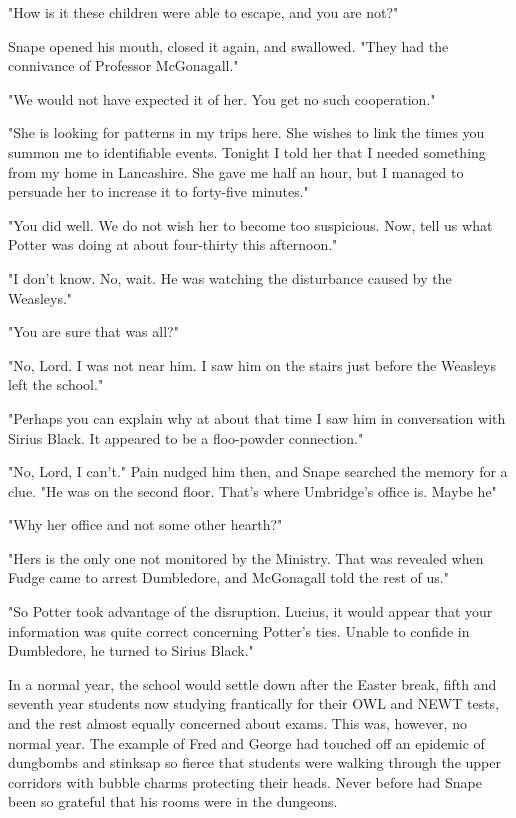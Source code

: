 "How is it these children were able to escape, and you are not?"

Snape opened his mouth, closed it again, and swallowed. "They had the connivance of Professor McGonagall."

"We would not have expected it of her. You get no such cooperation."

"She is looking for patterns in my trips here. She wishes to link the times you summon me to identifiable events. Tonight I told her that I needed something from my home in Lancashire. She gave me half an hour, but I managed to persuade her to increase it to forty-five minutes."

"You did well. We do not wish her to become too suspicious. Now, tell us what Potter was doing at about four-thirty this afternoon."

"I don't know. No, wait. He was watching the disturbance caused by the Weasleys."

"You are sure that was all?"

"No, Lord. I was not near him. I saw him on the stairs just before the Weasleys left the school."

"Perhaps you can explain why at about that time I saw him in conversation with Sirius Black. It appeared to be a floo-powder connection."

"No, Lord, I can't." Pain nudged him then, and Snape searched the memory for a clue. "He was on the second floor. That's where Umbridge's office is. Maybe he{\el}"

"Why her office and not some other hearth?"

"Hers is the only one not monitored by the Ministry. That was revealed when Fudge came to arrest Dumbledore, and McGonagall told the rest of us."

"So Potter took advantage of the disruption. Lucius, it would appear that your information was quite correct concerning Potter's ties. Unable to confide in Dumbledore, he turned to Sirius Black."

\sbreak

In a normal year, the school would settle down after the Easter break, fifth and seventh year students now studying frantically for their OWL and NEWT tests, and the rest almost equally concerned about exams. This was, however, no normal year. The example of Fred and George had touched off an epidemic of dungbombs and stinksap so fierce that students were walking through the upper corridors with bubble charms protecting their heads. Never before had Snape been so grateful that his rooms were in the dungeons.

